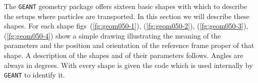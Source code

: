             
 
The {\tt GEANT} geometry package offers sixteen basic shapes with which
to describe the setups where particles are transported. In this section
we will describe these shapes. For each shape figs~(\ref{fg:geom050-1}),
(\ref{fg:geom050-2}), (\ref{fg:geom050-3}), (\ref{fg:geom050-4}) 
show a simple drawing illustrating the
meaning of the parameters and the position and orientation of the
reference frame proper of that shape. A description of the shapes and of
their parameters follows. Angles are always in degrees. With every shape is
given the code which is used internally by {\tt GEANT} to identify it.
 
